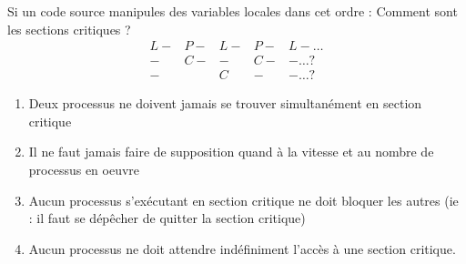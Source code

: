 Si un code source manipules des variables locales dans cet ordre : Comment sont les sections critiques ?
$$
\begin{array}{ccccc}
L-&P-&L-&P-&L- \ldots \\
 -&C-& -&C-& - \ldots ? \\
 -&  &C & -& - \ldots ?
\end{array}
$$ 

\begin{enumerate}
	\item Deux processus ne doivent jamais se trouver simultanément en section critique
	\item Il ne faut jamais faire de supposition quand à la vitesse et au nombre de processus en oeuvre
	\item Aucun processus s'exécutant en section critique ne doit bloquer les autres (ie : il faut se dépêcher de quitter la section critique)
	\item Aucun processus ne doit attendre indéfiniment l'accès à une section critique.
\end{enumerate}


